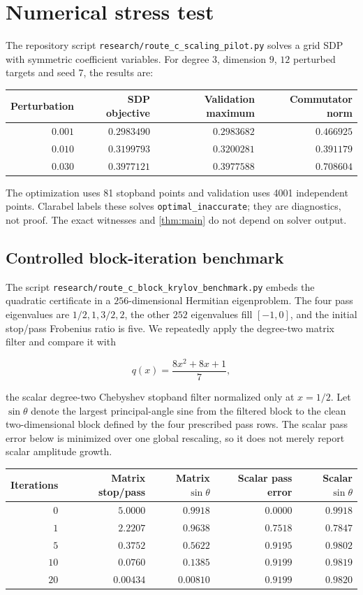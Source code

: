 \documentclass[11pt]{article}
\theoremstyle{remark}
\begin{document}
\section{Numerical stress test}

The repository script \texttt{research/route\_c\_scaling\_pilot.py} solves a
grid SDP with symmetric coefficient variables.  For degree $3$, dimension $9$,
$12$ perturbed targets and seed 7, the results are:
\begin{center}
\begin{tabular}{@{}rrrr@{}}
\toprule
Perturbation & SDP objective & Validation maximum & Commutator norm\\
\midrule
$0.001$ & $0.2983490$ & $0.2983682$ & $0.466925$\\
$0.010$ & $0.3199793$ & $0.3200281$ & $0.391179$\\
$0.030$ & $0.3977121$ & $0.3977588$ & $0.708604$\\
\bottomrule
\end{tabular}
\end{center}
The optimization uses 81 stopband points and validation uses 4001 independent
points.  Clarabel labels these solves \texttt{optimal\_inaccurate}; they are
diagnostics, not proof.  The exact witnesses and \cref{thm:main} do not depend
on solver output.

\subsection{Controlled block-iteration benchmark}

The script \texttt{research/route\_c\_block\_krylov\_benchmark.py} embeds the
quadratic certificate in a $256$-dimensional Hermitian eigenproblem.  The four
pass eigenvalues are $1/2,1,3/2,2$, the other $252$ eigenvalues fill $[-1,0]$,
and the initial stop/pass Frobenius ratio is five.  We repeatedly apply the
degree-two matrix filter and compare it with

\[
 q(x)=\frac{8x^2+8x+1}{7},
\]

the scalar degree-two Chebyshev stopband filter normalized only at $x=1/2$.
Let $\sin\theta$ denote the largest principal-angle sine from the filtered
block to the clean two-dimensional block defined by the four prescribed pass
rows.  The scalar pass error below is minimized over one global rescaling, so
it does not merely report scalar amplitude growth.

\begin{center}
\begin{tabular}{@{}rrrrr@{}}
\toprule
Iterations & Matrix stop/pass & Matrix $\sin\theta$ & Scalar pass error & Scalar $\sin\theta$\\
\midrule
$0$  & $5.0000$ & $0.9918$ & $0.0000$ & $0.9918$\\
$1$  & $2.2207$ & $0.9638$ & $0.7518$ & $0.7847$\\
$5$  & $0.3752$ & $0.5622$ & $0.9195$ & $0.9802$\\
$10$ & $0.0760$ & $0.1385$ & $0.9199$ & $0.9819$\\
$20$ & $0.00434$ & $0.00810$ & $0.9199$ & $0.9820$\\
\bottomrule
\end{tabular}
\end{center}
\end{document}
